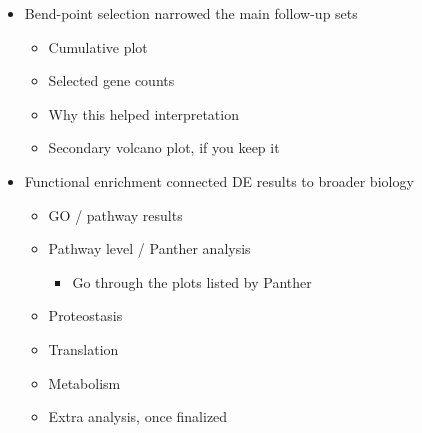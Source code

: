 \documentclass[12pt]{article}
\begin{document}
\begin{itemize}
\begin{itemize}
\begin{itemize}
\item \textcolor{nikhicolor}{Include a secondary Volcano Plot with a new threshold}
\end{itemize}
\item \textcolor{nikhicolor}{Heatmap}
\begin{itemize}
\item \textcolor{nikhicolor}{Including the interpretation of the distance heatmap between the two conditions}
\end{itemize}
\end{itemize}
\item \textcolor{pitercolor}{Bend-point selection narrowed the main follow-up sets}
\begin{itemize}
\item \textcolor{pitercolor}{Cumulative plot}
\item \textcolor{pitercolor}{Selected gene counts}
\item \textcolor{pitercolor}{Why this helped interpretation}
\item \textcolor{pitercolor}{Secondary volcano plot, if you keep it}
\end{itemize}
\item \textcolor{nikhicolor}{Functional enrichment connected DE results to broader biology}
\begin{itemize}
\item \textcolor{nikhicolor}{GO / pathway results}
\item \textcolor{nikhicolor}{Pathway level / Panther analysis}
\begin{itemize}
\item \textcolor{nikhicolor}{Go through the plots listed by Panther}
\end{itemize}
\item \textcolor{nikhicolor}{Proteostasis}
\item \textcolor{nikhicolor}{Translation}
\item \textcolor{nikhicolor}{Metabolism}
\item \textcolor{nikhicolor}{Extra analysis, once finalized}
\end{itemize}
\end{itemize}
\end{document}
